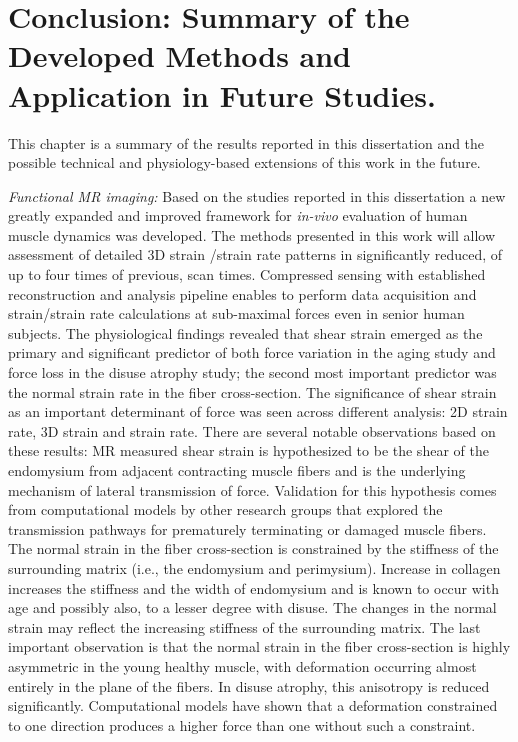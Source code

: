 \chapter{Conclusion: Summary of the Developed Methods and Application in Future Studies.}
This chapter is a summary of the results reported in this dissertation and the possible technical and physiology-based extensions of this work in the future. 

\textit{Functional MR imaging:} Based on the studies reported in this dissertation a new greatly expanded and improved framework for \textit{in-vivo} evaluation of human muscle dynamics was developed.
The methods presented in this work will allow assessment of detailed 3D strain /strain rate patterns in significantly reduced, of up to four times of previous, scan times.
Compressed sensing with established reconstruction and analysis pipeline enables to perform data acquisition and strain/strain rate calculations at sub-maximal forces even in senior human subjects.
The physiological findings revealed that shear strain emerged as the primary and significant predictor of both force variation in the aging study and force loss in the disuse atrophy study; the second most important predictor was the normal strain rate in the fiber cross-section. 
The significance of shear strain as an important determinant of force was seen across different analysis: 2D strain rate, 3D strain and strain rate. 
There are several notable observations based on these results: MR measured shear strain is hypothesized to be the shear of the endomysium from adjacent contracting muscle fibers and is the underlying mechanism of lateral transmission of force. 
Validation for this hypothesis comes from computational models by other research groups that explored the transmission pathways for prematurely terminating or damaged muscle fibers. 
The normal strain in the fiber cross-section is constrained by the stiffness of the surrounding matrix (i.e., the endomysium and perimysium). 
Increase in collagen increases the stiffness and the width of endomysium and is known to occur with age and possibly also, to a lesser degree with disuse. 
The changes in the normal strain may reflect the increasing stiffness of the surrounding matrix. 
The last important observation is that the normal strain in the fiber cross-section is highly asymmetric in the young healthy muscle, with deformation occurring almost entirely in the plane of the fibers. 
In disuse atrophy, this anisotropy is reduced significantly. 
Computational models have shown that a deformation constrained to one direction produces a higher force than one without such a constraint. 
